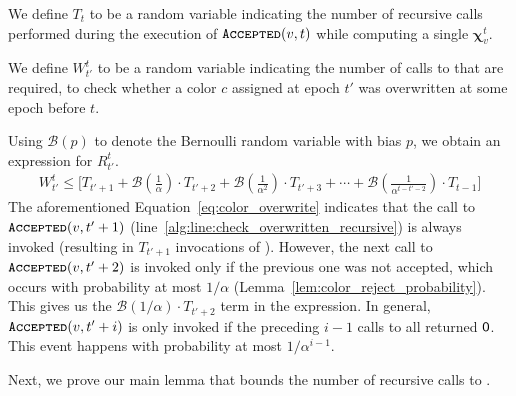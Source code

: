 \begin{definition}
\label{def:coloring_recursions}
We define $T_t$ to be a random variable indicating the number of recursive calls performed during the execution of $\texttt{\textsc{Accepted}}(v,t)$
while computing a single $\bm \chi_v^t$.
\end{definition}

\begin{definition}
\label{def:blah}
We define $W^t_{t'}$ to be a random variable indicating the number of calls to  that are required,
to check whether a color $c$ assigned at epoch $t'$ was overwritten at some epoch before $t$.
\end{definition}
Using $\mathcal B(p)$ to denote the Bernoulli random variable with bias $p$, we obtain an expression for $R^t_{t'}$.
\begin{align}
\label{eq:color_overwrite}
W^t_{t'} \le \Biggl[T_{t'+1} + \mathcal B\left(\frac{1}{\alpha}\right)\cdot T_{t'+2}
+ \mathcal B\left(\frac{1}{\alpha^2}\right)\cdot T_{t'+3} + \cdots
+ \mathcal B\left(\frac{1}{\alpha^{t-t'-2}}\right)\cdot T_{t-1} \Biggr]
\end{align}
The aforementioned Equation~\ref{eq:color_overwrite} indicates that the call to $\texttt{\textsc{Accepted}}(v, t'+1)$
(line~\ref{alg:line:check_overwritten_recursive}) is always invoked (resulting in $T_{t'+1}$ invocations of ).
However, the next call to $\texttt{\textsc{Accepted}}(v, t'+2)$ is invoked only if the previous one was not accepted,
which occurs with probability at most $1/\alpha$ (Lemma~\ref{lem:color_reject_probability}).
This gives us the $\mathcal B(1/\alpha)\cdot T_{t'+2}$ term in the expression.
In general, $\texttt{\textsc{Accepted}}(v, t'+i)$ is only invoked if the preceding $i-1$ calls to  all returned $\mathsf{0}$.
This event happens with probability at most $1/\alpha^{i-1}$.

Next, we prove our main lemma that bounds the number of recursive calls to .

